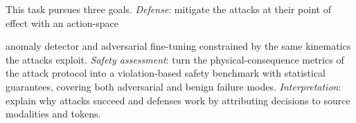 \documentclass[11pt,letterpaper]{article}
\begin{document}
This task pursues three goals.  \emph{Defense}: mitigate the attacks at their point of effect with an action-space 
\begin{table}{\vspace{-3ex}}
\centering
\caption{\scriptsize{(\textbf{T})raining\&(\textbf{I})nference defenses.}}\vspace{-2ex}
\label{tab:defense}
\vspace{-2ex}
\end{table}
anomaly detector and adversarial fine-tuning constrained by the same kinematics the attacks exploit.
   \emph{Safety assessment}: turn the physical-consequence metrics of the attack protocol into a violation-based safety benchmark with statistical guarantees, covering both adversarial and benign failure modes.  \emph{Interpretation}: explain why attacks succeed and defenses work by attributing decisions to source modalities and tokens. 
\\
\end{document}
